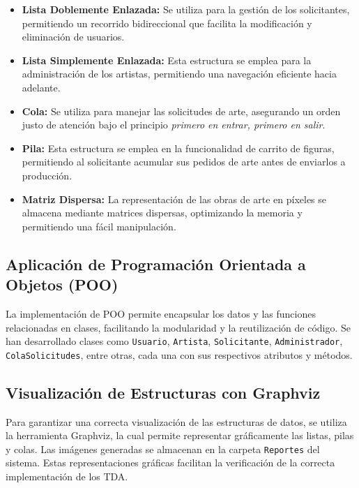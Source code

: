 \documentclass[letterpaper,12pt]{article}
\begin{document}
\begin{multicols}{2}
    \begin{itemize}
        \item \textbf{Lista Doblemente Enlazada:} Se utiliza para la gesti\'on de los solicitantes, permitiendo un recorrido bidireccional que facilita la modificaci\'on y eliminaci\'on de usuarios.
        \item \textbf{Lista Simplemente Enlazada:} Esta estructura se emplea para la administraci\'on de los artistas, permitiendo una navegaci\'on eficiente hacia adelante.
        \item \textbf{Cola:} Se utiliza para manejar las solicitudes de arte, asegurando un orden justo de atenci\'on bajo el principio \textit{primero en entrar, primero en salir}.
        \item \textbf{Pila:} Esta estructura se emplea en la funcionalidad de carrito de figuras, permitiendo al solicitante acumular sus pedidos de arte antes de enviarlos a producci\'on.
        \item \textbf{Matriz Dispersa:} La representaci\'on de las obras de arte en p\'ixeles se almacena mediante matrices dispersas, optimizando la memoria y permitiendo una f\'acil manipulaci\'on.
    \end{itemize}
    
    \subsection*{Aplicaci\'on de Programaci\'on Orientada a Objetos (POO)}
    La implementaci\'on de POO permite encapsular los datos y las funciones relacionadas en clases, facilitando la modularidad y la reutilizaci\'on de c\'odigo. Se han desarrollado clases como \texttt{Usuario}, \texttt{Artista}, \texttt{Solicitante}, \texttt{Administrador}, \texttt{ColaSolicitudes}, entre otras, cada una con sus respectivos atributos y m\'etodos.
    
    \subsection*{Visualizaci\'on de Estructuras con Graphviz}
    Para garantizar una correcta visualizaci\'on de las estructuras de datos, se utiliza la herramienta Graphviz, la cual permite representar gr\'aficamente las listas, pilas y colas. Las im\'agenes generadas se almacenan en la carpeta \texttt{Reportes} del sistema. Estas representaciones gr\'aficas facilitan la verificaci\'on de la correcta implementaci\'on de los TDA.
    

    \newpage




\end{multicols}
\end{document}
